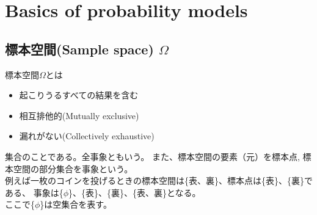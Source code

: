 \documentclass[a4j]{jarticle}
\begin{document}
\section{Basics of probability models}


\subsection{標本空間(Sample space) $\Omega$}
標本空間$\Omega$とは
\begin{itemize}
    \item 起こりうるすべての結果を含む
    \item 相互排他的(Mutually exclusive)
    \item 漏れがない(Collectively exhaustive)
\end{itemize}
集合のことである。全事象ともいう。
また、標本空間の要素（元）を標本点, 標本空間の部分集合を事象という。\\
例えば一枚のコインを投げるときの標本空間は\{表、裏\}、標本点は\{表\}、\{裏\}である、
事象は\{$\phi$\}、\{表\}、\{裏\}、\{表、裏\}となる。\\
ここで\{$\phi$\}は空集合を表す。
\end{document}

